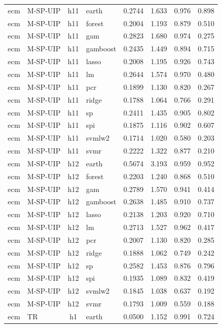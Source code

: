 \begin{ThreePartTable}
\begin{longtable}[t]{llclcccc}
ecm & M-SP-UIP & h11 & earth & 0.2744 & 1.633 & 0.976 & 0.898\\
ecm & M-SP-UIP & h11 & forest & 0.2004 & 1.193 & 0.879 & 0.510\\
ecm & M-SP-UIP & h11 & gam & 0.2823 & 1.680 & 0.974 & 0.275\\
ecm & M-SP-UIP & h11 & gamboost & 0.2435 & 1.449 & 0.894 & 0.715\\
ecm & M-SP-UIP & h11 & lasso & 0.2008 & 1.195 & 0.926 & 0.743\\
ecm & M-SP-UIP & h11 & lm & 0.2644 & 1.574 & 0.970 & 0.480\\
ecm & M-SP-UIP & h11 & pcr & 0.1899 & 1.130 & 0.820 & 0.267\\
ecm & M-SP-UIP & h11 & ridge & 0.1788 & 1.064 & 0.766 & 0.291\\
ecm & M-SP-UIP & h11 & sp & 0.2411 & 1.435 & 0.905 & 0.802\\
ecm & M-SP-UIP & h11 & spi & 0.1875 & 1.116 & 0.902 & 0.607\\
ecm & M-SP-UIP & h11 & svmlw2 & 0.1714 & 1.020 & 0.580 & 0.203\\
ecm & M-SP-UIP & h11 & svmr & 0.2222 & 1.322 & 0.877 & 0.210\\
\addlinespace
ecm & M-SP-UIP & h12 & earth & 0.5674 & 3.193 & 0.959 & 0.952\\
ecm & M-SP-UIP & h12 & forest & 0.2203 & 1.240 & 0.868 & 0.510\\
ecm & M-SP-UIP & h12 & gam & 0.2789 & 1.570 & 0.941 & 0.414\\
ecm & M-SP-UIP & h12 & gamboost & 0.2638 & 1.485 & 0.910 & 0.737\\
ecm & M-SP-UIP & h12 & lasso & 0.2138 & 1.203 & 0.920 & 0.710\\
ecm & M-SP-UIP & h12 & lm & 0.2713 & 1.527 & 0.962 & 0.417\\
ecm & M-SP-UIP & h12 & pcr & 0.2007 & 1.130 & 0.820 & 0.285\\
ecm & M-SP-UIP & h12 & ridge & 0.1888 & 1.062 & 0.749 & 0.242\\
ecm & M-SP-UIP & h12 & sp & 0.2582 & 1.453 & 0.876 & 0.796\\
ecm & M-SP-UIP & h12 & spi & 0.1935 & 1.089 & 0.832 & 0.419\\
ecm & M-SP-UIP & h12 & svmlw2 & 0.1845 & 1.038 & 0.637 & 0.192\\
ecm & M-SP-UIP & h12 & svmr & 0.1793 & 1.009 & 0.559 & 0.188\\
\addlinespace
ecm & TR & h1 & earth & 0.0500 & 1.152 & 0.991 & 0.724\\

\end{longtable}
\end{ThreePartTable}
